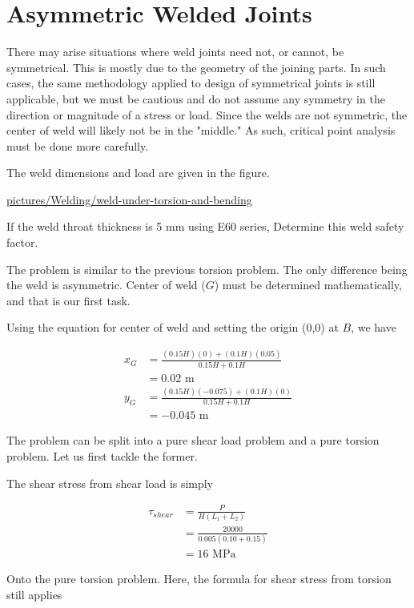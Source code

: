 \documentclass[a4paper,openany,12pt]{book}
\begin{document}
{{\section{Asymmetric Welded Joints}
\label{sec:orga0c2bb8}
There may arise situations where weld joints need not, or cannot, be
symmetrical. This is mostly due to the geometry of the joining parts. In
such cases, the same methodology applied to design of symmetrical joints
is still applicable, but we must be cautious and do not assume any
symmetry in the direction or magnitude of a stress or load. Since the
welds are not symmetric, the center of weld will likely not be in the
"middle." As such, critical point analysis must be done more carefully.

The weld dimensions and load are given in the figure.

\url{pictures/Welding/weld-under-torsion-and-bending}

If the weld throat thickness is 5 mm using E60 series, Determine this
weld safety factor.

The problem is similar to the previous torsion problem. The only
difference being the weld is asymmetric. Center of weld (\(G\)) must be
determined mathematically, and that is our first task.

Using the equation for center of weld and setting the origin (0,0) at
\(B\), we have

$$\begin{aligned}
    x_G &= \frac{(0.15H)(0) + (0.1H)(0.05)}{ 0.15H + 0.1H } \\
        &= 0.02 \text{ m} \\
    y_G &= \frac{(0.15H)(-0.075) + (0.1H)(0)}{ 0.15H + 0.1H } \\
        &= -0.045 \text{ m} 
  \end{aligned}$$

The problem can be split into a pure shear load problem and a pure
torsion problem. Let us first tackle the former.

The shear stress from shear load is simply

$$\begin{aligned}
    \tau_{shear} &= \frac{P}{H(L_1 + L_2)} \\
                 &= \frac{20000}{0.005(0.10 + 0.15)} \\
                 &= 16 \text{ MPa}
  \end{aligned}$$

Onto the pure torsion problem. Here, the formula for shear stress from
torsion still applies

}}
\end{document}
